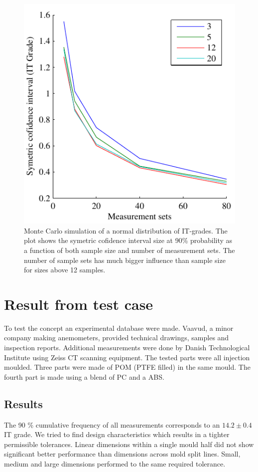 \documentclass[aip,amsmath, reprint, author-year]{revtex4-1}
\begin{document}
\begin{figure}
\includegraphics{CLW90_lines.pdf}
\caption{\label{fig:cl_line} Monte Carlo simulation of a normal distribution of IT-grades. The plot shows the symetric cofidence interval size at 90\% probability as a function of both sample size and number of measurement sets. 
The number of sample sets has much bigger influence than sample size for sizes above 12 samples. }
\end{figure}

\section{Result from test case}
\label{sec:result}

To test the concept an experimental database were made. 
Vaavud, a minor company making anemometers, provided technical drawings,  samples and inspection reports. 
Additional measurements were done by Danish Technological Institute using Zeiss CT scanning equipment.
The tested parts were all injection moulded. 
Three parts were made of POM (PTFE filled) in the same mould. 
The fourth part is made using a blend of PC and a ABS.

\subsection{Results}

The 90 \% cumulative frequency of all measurements corresponds to an $14.2 \pm 0.4 $ IT grade. We tried to find design characteristics which results in a tighter permissible tolerances. Linear dimensions within a single mould half did not show significant better performance than dimensions across mold split lines.  Small, medium and large dimensions performed to the same required tolerance.  
\end{document}
